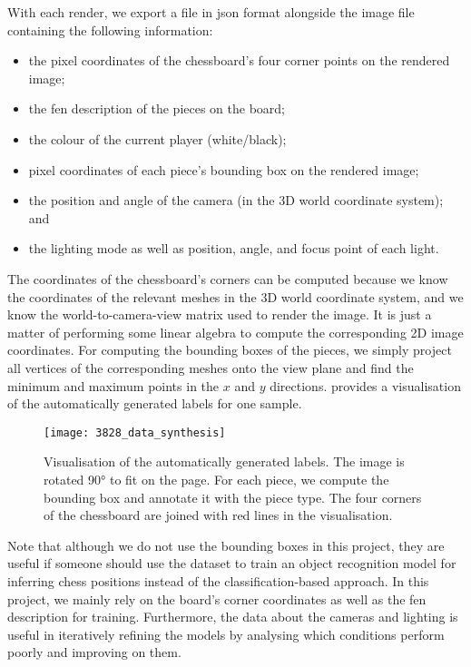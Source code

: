 \documentclass[../report.tex]{subfiles}
\begin{document}
With each render, we export a file in \gls{json} format alongside the image file containing the following information:
\begin{itemize}
    \item the pixel coordinates of the chessboard's four corner points on the rendered image;
    \item the \gls{fen} description of the pieces on the board;
    \item the colour of the current player (white/black);
    \item pixel coordinates of each piece's bounding box on the rendered image;
    \item the position and angle of the camera (in the 3D world coordinate system); and
    \item the lighting mode as well as position, angle, and focus point of each light.
\end{itemize}
The coordinates of the chessboard's corners can be computed because we know the coordinates of the relevant meshes in the 3D world coordinate system, and we know the world-to-camera-view matrix used to render the image.
It is just a matter of performing some linear algebra to compute the corresponding 2D image coordinates.
For computing the bounding boxes of the pieces, we simply project all vertices of the corresponding meshes onto the view plane and find the minimum and maximum points in the $x$ and $y$ directions.
 provides a visualisation of the automatically generated labels for one sample.
\begin{figure}
    \centering
    \texttt{[image: 3828\_data\_synthesis]}
    \caption[Visualisation of the automatically generated labels.]{Visualisation of the automatically generated labels. The image is rotated 90° to fit on the page. For each piece, we compute the bounding box and annotate it with the piece type. The four corners of the chessboard are joined with red lines in the visualisation.}
    \label{fig:data_synthesis_visualisation}
\end{figure}
Note that although we do not use the bounding boxes in this project, they are useful if someone should use the dataset to train an object recognition model for inferring chess positions instead of the classification-based approach.
In this project, we mainly rely on the board's corner coordinates as well as the \gls{fen} description for training.
Furthermore, the data about the cameras and lighting is useful in iteratively refining the models by analysing which conditions perform poorly and improving on them.
\end{document}
